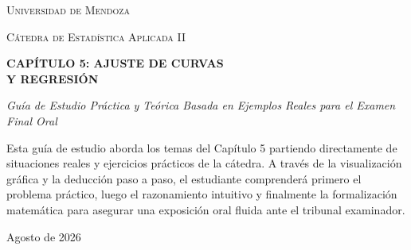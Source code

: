 \documentclass[11pt,a4paper]{article}
\begin{document}
\hypersetup{pageanchor=false}

\begin{titlepage}
    \centering
    \vspace*{1.5cm}
    {\scshape\LARGE Universidad de Mendoza \par}
    \vspace*{0.5cm}
    {\scshape\Large Cátedra de Estadística Aplicada II \par}
    \vspace*{1.5cm}
    {\Huge\bfseries CAPÍTULO 5: AJUSTE DE CURVAS \\ Y REGRESIÓN \par}
    \vspace*{0.8cm}
    {\Large\itshape Guía de Estudio Práctica y Teórica Basada en Ejemplos Reales para el Examen Final Oral \par}
    \vspace*{1.5cm}
    \vfill
    \begin{tcolorbox}[colback=blue!5!white,colframe=blue!40!black,title=Enfoque Pedagógico de esta Guía]
        Esta guía de estudio aborda los temas del Capítulo 5 partiendo directamente de situaciones reales y ejercicios prácticos de la cátedra. A través de la visualización gráfica y la deducción paso a paso, el estudiante comprenderá primero el problema práctico, luego el razonamiento intuitivo y finalmente la formalización matemática para asegurar una exposición oral fluida ante el tribunal examinador.
    \end{tcolorbox}
    \vfill
    {\large Agosto de 2026 \par}
\end{titlepage}
\hypersetup{pageanchor=true}
\newpage

\tableofcontents
\newpage
\end{document}
